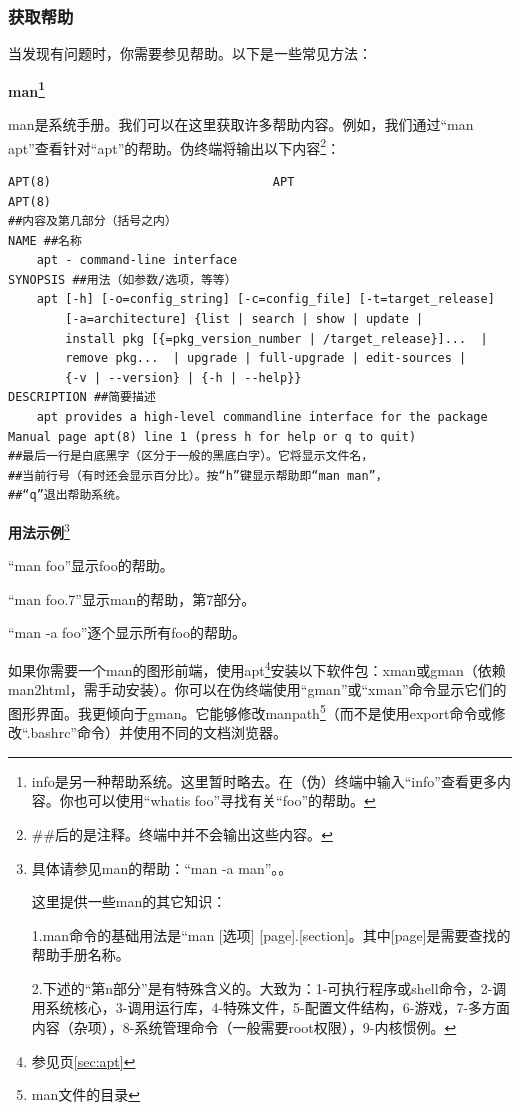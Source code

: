 \documentclass{book}
\begin{document}
\subsubsection{获取帮助}
\cite{manman}\par
当发现有问题时，你需要参见帮助。以下是一些常见方法：\par
\Large \textbf{man\footnote{info是另一种帮助系统。这里暂时略去。在（伪）终端中输入“info”查看更多内容。你也可以使用“whatis foo”寻找有关“foo”的帮助。}} \normalsize \par
man是系统手册。我们可以在这里获取许多帮助内容。例如，我们通过“man apt”查看针对“apt”的帮助。伪终端将输出以下内容\footnote{\#\#后的是注释。终端中并不会输出这些内容。}：
\begin{verbatim}
APT(8)                               APT                              APT(8)
##内容及第几部分（括号之内）
NAME ##名称
    apt - command-line interface
SYNOPSIS ##用法（如参数/选项，等等）
    apt [-h] [-o=config_string] [-c=config_file] [-t=target_release]
        [-a=architecture] {list | search | show | update |
        install pkg [{=pkg_version_number | /target_release}]...  |
        remove pkg...  | upgrade | full-upgrade | edit-sources |
        {-v | --version} | {-h | --help}}
DESCRIPTION ##简要描述
    apt provides a high-level commandline interface for the package
Manual page apt(8) line 1 (press h for help or q to quit)
##最后一行是白底黑字（区分于一般的黑底白字）。它将显示文件名，
##当前行号（有时还会显示百分比）。按“h”键显示帮助即“man man”，
##“q”退出帮助系统。
\end{verbatim}
\Large  \textbf{用法示例}\footnote{具体请参见man的帮助：“man -a man”。。\par 这里提供一些man的其它知识：\par 1.man命令的基础用法是“man [选项] [page].[section]。其中[page]是需要查找的帮助手册名称。\par 2.下述的“第n部分”是有特殊含义的。大致为：1-可执行程序或shell命令，2-调用系统核心，3-调用运行库，4-特殊文件，5-配置文件结构，6-游戏，7-多方面内容（杂项），8-系统管理命令（一般需要root权限），9-内核惯例。} \normalsize \par
“man foo”显示foo的帮助。\par
“man foo.7”显示man的帮助，第7部分。\par
“man -a foo”逐个显示所有foo的帮助。\par
如果你需要一个man的图形前端，使用apt\footnote{参见\pageref{sec:apt}页\ref{sec:apt}}安装以下软件包：xman或gman（依赖man2html，需手动安装）。你可以在伪终端使用“gman”或“xman”命令显示它们的图形界面。我更倾向于gman。它能够修改manpath\footnote{man文件的目录}（而不是使用export命令或修改“.bashrc”命令）并使用不同的文档浏览器。\par
\end{document}
